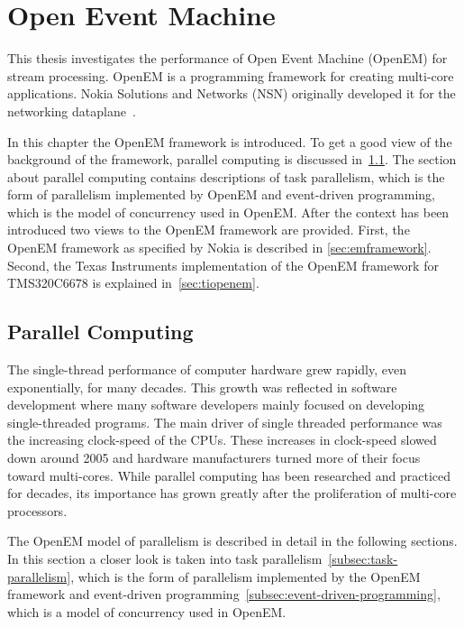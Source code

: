 \chapter{Open Event Machine}
\label{chapter:openem}
This thesis investigates the performance of Open Event Machine (OpenEM) for stream processing. OpenEM is a programming framework for creating multi-core applications. Nokia Solutions and Networks (NSN) originally developed it for the networking dataplane~\cite{openemintro}.

In this chapter the OpenEM framework is introduced. To get a good view of the background of the framework, parallel computing is discussed in~\ref{sec:parallel-computing}. The section about parallel computing contains descriptions of task parallelism, which is the form of parallelism implemented by OpenEM and event-driven programming, which is the model of concurrency used in OpenEM. After the context has been introduced two views to the OpenEM framework are provided. First, the OpenEM framework as specified by Nokia is described in \ref{sec:emframework}. Second, the Texas Instruments implementation of the OpenEM framework for TMS320C6678 is explained in~\ref{sec:tiopenem}.

\section{Parallel Computing}
\label{sec:parallel-computing}
The single-thread performance of computer hardware grew rapidly, even exponentially, for many decades. This growth was reflected in software development where many software developers mainly focused on developing single-threaded programs. The main driver of single threaded performance was the increasing clock-speed of the CPUs. These increases in clock-speed slowed down around 2005 and hardware manufacturers turned more of their focus toward multi-cores. While parallel computing has been researched and practiced for decades, its importance has grown greatly after the proliferation of multi-core processors.~\cite{sutter2005free}

The OpenEM model of parallelism is described in detail in the following sections. In this section a closer look is taken into task parallelism~\ref{subsec:task-parallelism}, which is the form of parallelism implemented by the OpenEM framework and event-driven programming~\ref{subsec:event-driven-programming}, which is a model of concurrency used in OpenEM.


